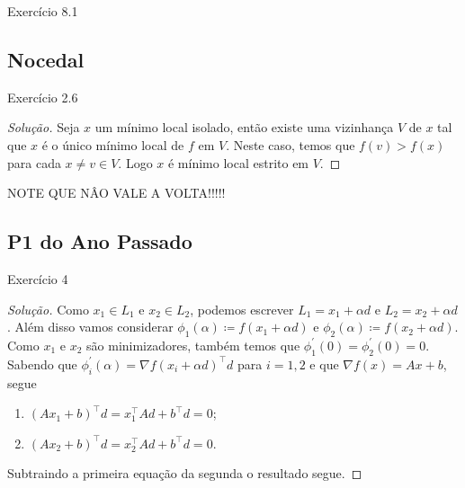 \documentclass[12pt,twoside,a4paper]{article}
\begin{document}
\begin{problema}
  Exercício 8.1
\end{problema}

\subsection{Nocedal}
\begin{problema}
  Exercício 2.6
\end{problema}
\begin{proof}[Solução]
Seja \(x\) um mínimo local isolado, então existe uma vizinhança \(V\) de \(x\)
tal que \(x\) é o único mínimo local de \(f\) em \(V\). Neste caso, temos que
\(f(v)>f(x)\) para cada \(x\not = v\in V\). Logo \(x\) é mínimo local estrito em \(V\).  
\end{proof}

NOTE QUE NÂO VALE A VOLTA!!!!!

\subsection{P1 do Ano Passado}
\begin{problema}
  Exercício 4
\end{problema}
\begin{proof}[Solução]
Como \(x_1\in L_1\) e \(x_2\in L_2\), podemos escrever \(L_1=x_1+\alpha d\) e
\(L_2=x_2+\alpha d\). Além disso vamos considerar \(\phi_1(\alpha)\coloneqq
f(x_1+\alpha d)\) e \(\phi_2(\alpha)\coloneqq f(x_2+\alpha d)\). Como \(x_1\) e
\(x_2\) são minimizadores, também temos que
\(\phi_1^\prime(0)=\phi_2^\prime(0)=0.\) Sabendo que
\(\phi_i^\prime(\alpha)=\nabla f(x_i+\alpha d)^\top d\) para \(i=1,2\) e que
\(\nabla f(x)=Ax+b\), segue
\begin{enumerate}
\item \((Ax_1+b)^\top d= x_1^\top Ad +b^\top d = 0\);
\item \((Ax_2+b)^\top d= x_2^\top Ad+ b^\top d = 0\).  
\end{enumerate}

Subtraindo a primeira equação da segunda o resultado segue.

\end{proof}
\end{document}
